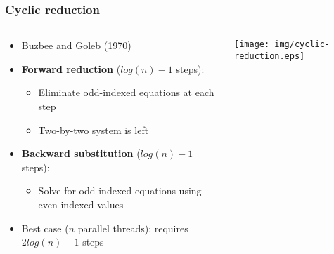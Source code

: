 \begin{frame}
\frametitle{Cyclic reduction}
\begin{columns}
\begin{column}{0.5\textwidth}
\begin{itemize}
\item Buzbee and Goleb (1970)
\item \textbf{Forward reduction} ($log(n)-1$ steps):
    \begin{itemize}
    \item Eliminate odd-indexed equations at each step
    \item Two-by-two system is left
    \end{itemize}
\item \textbf{Backward substitution} ($log(n)-1$ steps):
    \begin{itemize}
    \item Solve for odd-indexed equations using even-indexed values
    \end{itemize}
\item Best case ($n$ parallel threads): requires $2log(n)-1$ steps
\end{itemize}
\end{column}
\begin{column}{0.5\textwidth}
\texttt{[image: img/cyclic-reduction.eps]}
\end{column}
\end{columns}
\end{frame}

